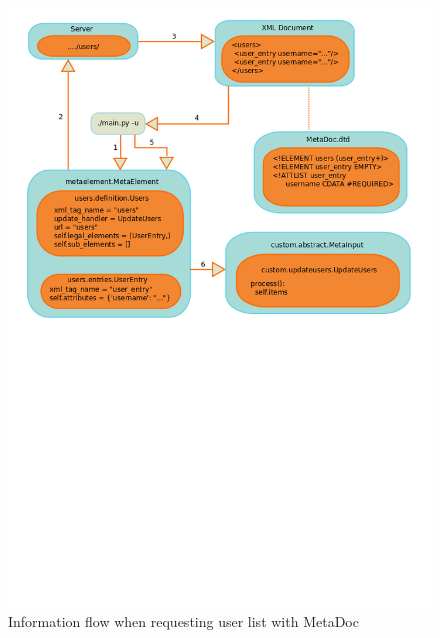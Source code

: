 \documentclass[titlepage, a4paper,10pt]{article}
\begin{document}
\begin{figure}[h!]
    \includegraphics[width=\textwidth]{img/xml_flow}
    \caption{Information flow when requesting user list with MetaDoc}
    \label{fig:information_flow}
\end{figure}
\end{document}
